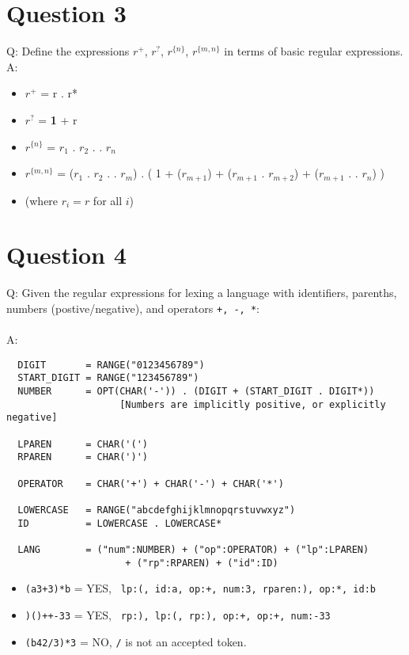 \documentclass[english]{scrartcl}
\begin{document}
\section*{Question 3}
Q: Define the expressions $r^+$, $r^?$, $r^{\{n\}}$, $r^{\{m,n\}}$ in terms of basic regular expressions. \\

A: \begin{itemize}
    \item $r^+$ = r . r*
    \item $r^?$ = \textbf{1} + r
    \item $r^{\{n\}}$ = $r_1$ . $r_2$ . \dotso . $r_n$
    \item $r^{\{m,n\}}$ = ($r_1$ . $r_2$ . \dotso . $r_m$) . ( 1 + ($r_{m+1}$) + ($r_{m+1}$ . $r_{m+2}$) + ($r_{m+1}$ . \dotso . $r_{n}$) )
    \item (where $r_i = r$ for all $i$)
\end{itemize}

\section*{Question 4}
Q: Given the regular expressions for lexing a language with identifiers, parenths, numbers (postive/negative), and operators \verb~+, -, *~: \\
\\
\newpage
A:
\begin{verbatim}
  DIGIT       = RANGE("0123456789")
  START_DIGIT = RANGE("123456789")
  NUMBER      = OPT(CHAR('-')) . (DIGIT + (START_DIGIT . DIGIT*))
                    [Numbers are implicitly positive, or explicitly negative]

  LPAREN      = CHAR('(')
  RPAREN      = CHAR(')')

  OPERATOR    = CHAR('+') + CHAR('-') + CHAR('*')

  LOWERCASE   = RANGE("abcdefghijklmnopqrstuvwxyz")
  ID          = LOWERCASE . LOWERCASE*

  LANG        = ("num":NUMBER) + ("op":OPERATOR) + ("lp":LPAREN)
                     + ("rp":RPAREN) + ("id":ID)

\end{verbatim}

\begin{itemize}
  \item \verb~(a3+3)*b~  = YES, \verb~ lp:(, id:a, op:+, num:3, rparen:), op:*, id:b ~
  \item \verb~)()++-33~ = YES, \verb~ rp:), lp:(, rp:), op:+, op:+, num:-33 ~
  \item \verb~(b42/3)*3~  = NO, \verb~/~ is not an accepted token.
\end{itemize}
\end{document}

